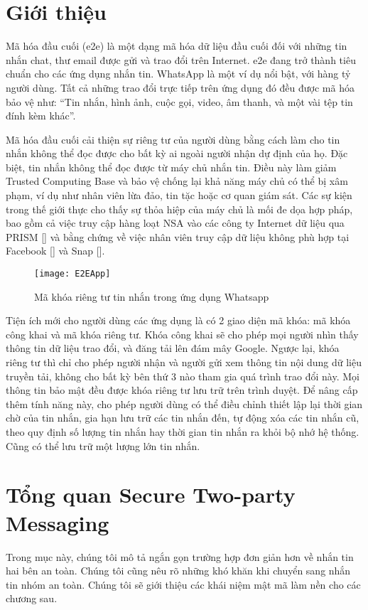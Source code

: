 \documentclass[../main-report.tex]{subfiles}
\begin{document}
\section{Giới thiệu}
Mã hóa đầu cuối (\acrshort{e2e}) là một dạng mã hóa dữ liệu đầu cuối đối với những tin nhắn chat, thư email được gửi và trao đổi trên Internet. \acrshort{e2e} đang trở thành tiêu chuẩn cho các ứng dụng nhắn tin. WhatsApp là một ví dụ nổi bật, với hàng tỷ người dùng. Tất cả những trao đổi trực tiếp trên ứng dụng đó đều được mã hóa bảo vệ như: “Tin nhắn, hình ảnh, cuộc gọi, video, âm thanh, và một vài tệp tin đính kèm khác”.

Mã hóa đầu cuối cải thiện sự riêng tư của người dùng bằng cách làm cho tin nhắn không thể đọc được cho bất kỳ ai ngoài người nhận dự định của họ. Đặc biệt, tin nhắn không thể đọc được từ máy chủ nhắn tin. Điều này làm giảm \gls{Trusted Computing Base} và bảo vệ chống lại khả năng máy chủ có thể bị xâm phạm, ví dụ như nhân viên lừa đảo, tin tặc hoặc cơ quan giám sát. Các sự kiện trong thế giới thực cho thấy sự thỏa hiệp của máy chủ là mối đe dọa hợp pháp, bao gồm cả việc truy cập hàng loạt NSA vào các công ty Internet dữ liệu qua PRISM [\cite{7}] và bằng chứng về việc nhân viên truy cập dữ liệu không phù hợp tại Facebook [\cite{8}] và Snap [\cite{9}].

\begin{figure}[ht!]
\begin{center}
\label{fig:E2E}
\texttt{[image: E2EApp]}
\caption{Mã khóa riêng tư tin nhắn trong ứng dụng Whatsapp}
\end{center}
\end{figure}

Tiện ích mới cho người dùng các ứng dụng là có 2 giao diện mã khóa: mã khóa công khai và mã khóa riêng tư. Khóa công khai sẽ cho phép mọi người nhìn thấy thông tin dữ liệu trao đổi, và đăng tải lên đám mây Google. Ngược lại, khóa riêng tư thì chỉ cho phép người nhận và người gửi xem thông tin nội dung dữ liệu truyền tải, không cho bất kỳ bên thứ 3 nào tham gia quá trình trao đổi này. Mọi thông tin bảo mật đều được khóa riêng tư lưu trữ trên trình duyệt. Để nâng cấp thêm tính năng này, cho phép người dùng có thể điều chỉnh thiết lập lại thời gian chờ của tin nhắn, gia hạn lưu trữ các tin nhắn đến, tự động xóa các tin nhắn cũ, theo quy định số lượng tin nhắn hay thời gian tin nhắn ra khỏi bộ nhớ hệ thống. Cũng có thể lưu trữ một lượng lớn tin nhắn.


\section{Tổng quan Secure Two-party Messaging}
\label{sec:related-work}
Trong mục này, chúng tôi mô tả ngắn gọn trường hợp đơn giản hơn về nhắn tin hai bên an toàn. Chúng tôi cũng nêu rõ những khó khăn khi chuyển sang nhắn tin nhóm an toàn. Chúng tôi sẽ giới thiệu các khái niệm mật mã làm nền cho các chương sau.
\end{document}
